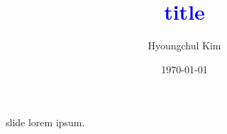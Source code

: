 \documentclass[notes,11pt, aspectratio=169]{beamer}
\title{\textcolor{blue}{title}}
\author{Hyoungchul Kim}
\institute{institute}
\date{\today}
\begin{document}
\begin{frame}[plain]
	\titlepage
\end{frame}

\setcounter{framenumber}{0}

\begin{frame}{slide}
	lorem ipsum.
\end{frame}
\end{document}
